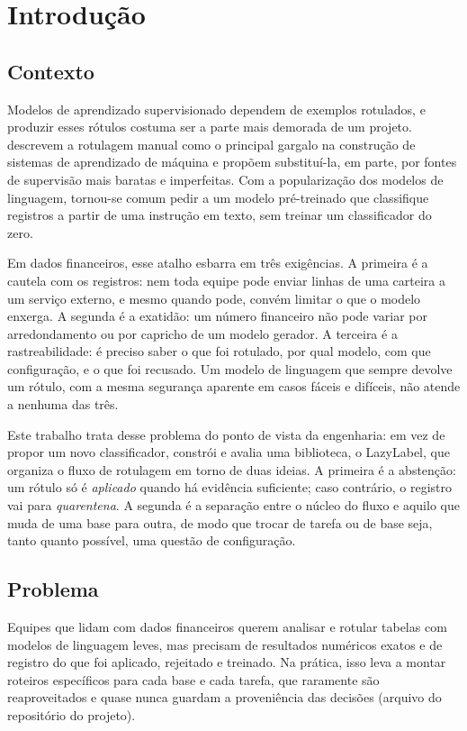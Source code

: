 \chapter{Introdução}
\label{cap:introducao}

\section{Contexto}

Modelos de aprendizado supervisionado dependem de exemplos rotulados, e produzir esses rótulos costuma ser a parte mais demorada de um projeto.  descrevem a rotulagem manual como o principal gargalo na construção de sistemas de aprendizado de máquina e propõem substituí-la, em parte, por fontes de supervisão mais baratas e imperfeitas. Com a popularização dos modelos de linguagem, tornou-se comum pedir a um modelo pré-treinado que classifique registros a partir de uma instrução em texto, sem treinar um classificador do zero.

Em dados financeiros, esse atalho esbarra em três exigências. A primeira é a cautela com os registros: nem toda equipe pode enviar linhas de uma carteira a um serviço externo, e mesmo quando pode, convém limitar o que o modelo enxerga. A segunda é a exatidão: um número financeiro não pode variar por arredondamento ou por capricho de um modelo gerador. A terceira é a rastreabilidade: é preciso saber o que foi rotulado, por qual modelo, com que configuração, e o que foi recusado. Um modelo de linguagem que sempre devolve um rótulo, com a mesma segurança aparente em casos fáceis e difíceis, não atende a nenhuma das três.

Este trabalho trata desse problema do ponto de vista da engenharia: em vez de propor um novo classificador, constrói e avalia uma biblioteca, o LazyLabel, que organiza o fluxo de rotulagem em torno de duas ideias. A primeira é a abstenção: um rótulo só é \emph{aplicado} quando há evidência suficiente; caso contrário, o registro vai para \emph{quarentena}. A segunda é a separação entre o núcleo do fluxo e aquilo que muda de uma base para outra, de modo que trocar de tarefa ou de base seja, tanto quanto possível, uma questão de configuração.

\section{Problema}

Equipes que lidam com dados financeiros querem analisar e rotular tabelas com modelos de linguagem leves, mas precisam de resultados numéricos exatos e de registro do que foi aplicado, rejeitado e treinado. Na prática, isso leva a montar roteiros específicos para cada base e cada tarefa, que raramente são reaproveitados e quase nunca guardam a proveniência das decisões (arquivo  do repositório do projeto).

